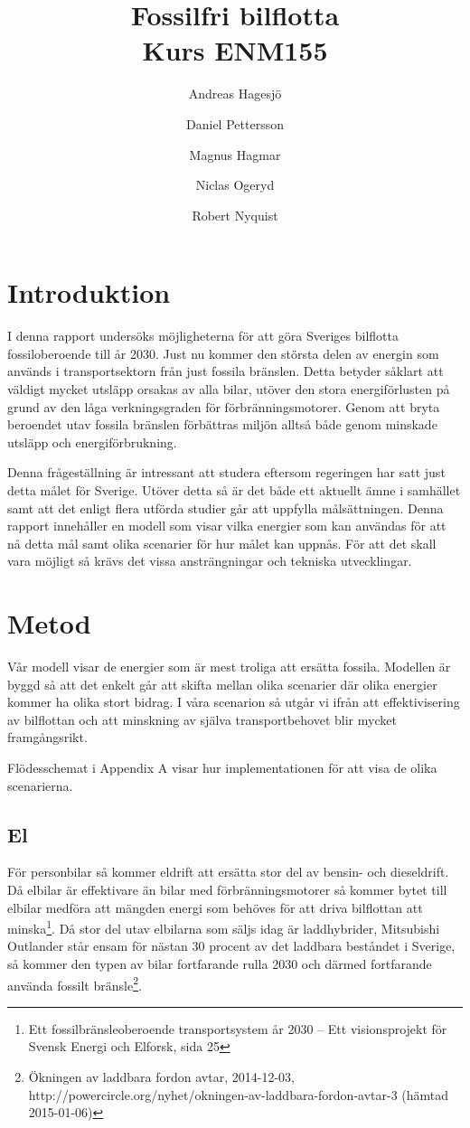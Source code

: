 \documentclass[a4paper,11pt,fleqn, titlepage]{article}
\author{Andreas Hagesjö \and Daniel Pettersson \and
Magnus Hagmar \and Niclas Ogeryd \and Robert Nyquist}
\title{Fossilfri bilflotta \\ Kurs ENM155}
\begin{document}
\maketitle

\section{Introduktion}
I denna rapport undersöks möjligheterna för att göra Sveriges bilflotta
fossiloberoende till år 2030. Just nu kommer den största delen av energin
som används i transportsektorn från just fossila bränslen. Detta betyder
såklart att väldigt mycket utsläpp orsakas av alla bilar, utöver den stora
energiförlusten på grund av den låga verkningsgraden för
förbränningsmotorer. Genom att bryta beroendet utav fossila bränslen
förbättras miljön alltså både genom minskade utsläpp och energiförbrukning.

Denna frågeställning är intressant att studera eftersom regeringen har satt
just detta målet för Sverige. Utöver detta så är det både ett aktuellt ämne
i samhället samt att det enligt flera utförda studier går att uppfylla
målsättningen. Denna rapport innehåller en modell som visar vilka energier
som kan användas för att nå detta mål samt olika scenarier för hur målet
kan uppnås. För att det skall vara möjligt så krävs det vissa
ansträngningar och tekniska utvecklingar.

\section{Metod}

Vår modell visar de energier som är mest troliga att ersätta fossila.
Modellen är byggd så att det enkelt går att skifta mellan olika scenarier
där olika energier kommer ha olika stort bidrag. I våra scenarion så utgår
vi ifrån att effektivisering av bilflottan och att minskning av själva
transportbehovet blir mycket framgångsrikt.


Flödesschemat i Appendix A visar hur implementationen för att visa de olika
scenarierna.

\subsection{El}

För personbilar så kommer eldrift att ersätta stor del av bensin- och
dieseldrift. Då elbilar är effektivare än bilar med förbränningsmotorer så
kommer bytet till elbilar medföra att mängden energi som behöves för att
driva bilflottan att minska\footnote{Ett fossilbränsleoberoende
transportsystem år 2030 – Ett visionsprojekt för Svensk Energi och Elforsk,
sida 25}. Då stor del utav elbilarna som säljs idag är laddhybrider,
Mitsubishi Outlander står ensam för nästan 30 procent av det laddbara
beståndet i Sverige, så kommer den typen av bilar fortfarande rulla 2030
och därmed fortfarande använda fossilt bränsle\footnote{Ökningen av
laddbara fordon avtar, 2014-12-03, \\
http://powercircle.org/nyhet/okningen-av-laddbara-fordon-avtar-3 (hämtad
2015-01-06)}.
\end{document}
